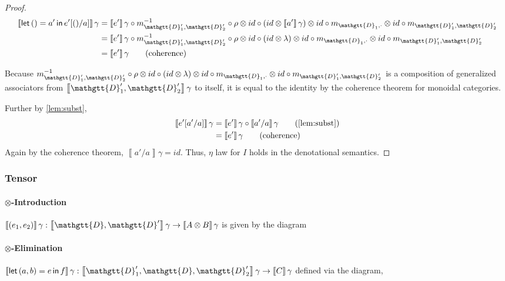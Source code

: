 \documentclass[acmsmall,nonacm]{acmart}
\renewcommand{\Delta}{\mathgtt{D}}
\newcommand{\sem}[1]{\left\llbracket{#1}\right\rrbracket}
\newcommand{\semg}[1]{\sem{#1}\gamma}
\newcommand{\letin}[3]{\mathsf{let}\, #1 = #2 \, \mathsf{in}\, #3}
\begin{document}
\begin{proof}
\begin{align*}
  \semg{\letin {()} {a'} {e'[()/a]}}
  & = \semg{e'} \circ m^{-1}_{\Delta'_{1},\Delta'_{2}} \circ \rho \otimes id \circ (id \otimes \semg{a'}) \otimes id \circ m_{\Delta_{1},\cdot} \otimes id \circ m_{\Delta'_{1},\Delta'_{2}} \\
  & = \semg{e'} \circ m^{-1}_{\Delta'_{1},\Delta'_{2}} \circ \rho \otimes id \circ (id \otimes \lambda) \otimes id \circ m_{\Delta_{1},\cdot} \otimes id \circ m_{\Delta'_{1},\Delta'_{2}} \\
  & = \semg{e'} \tag{coherence}
\end{align*}

Because
$m^{-1}_{\Delta'_{1},\Delta'_{2}} \circ \rho \otimes id \circ (id \otimes \lambda) \otimes id \circ m_{\Delta_{1},\cdot} \otimes id \circ m_{\Delta'_{1},\Delta'_{2}}$
is a composition of generalized associators from
$\semg{\Delta'_{1},\Delta'_{2}}$ to itself, it is equal to the identity by the coherence theorem for monoidal categories.

Further by \cref{lem:subst},
\begin{align*}
  \semg{e'[a'/a]}
  &= \semg{e'} \circ \semg{a'/a} \tag{\cref{lem:subst}} \\
  &= \semg{e'} \tag{coherence}
\end{align*}
Again by the coherence theorem, $\semg{a'/a} = id$. Thus, $\eta$ law for $I$
holds in the denotational semantics.
\end{proof}

\subsubsection{Tensor}
\paragraph{$\otimes$-Introduction}
$\semg{(e_{1}, e_{2})} : \semg{\Delta,\Delta'} \to \semg{A \otimes B}$ is given
by the diagram

\begin{center}
\end{center}

\paragraph{$\otimes$-Elimination}
$\semg{\letin {(a,b)} e f} : \semg{\Delta'_{1},\Delta,\Delta'_{2}} \to \semg{C}$
defined via the diagram,
\end{document}
